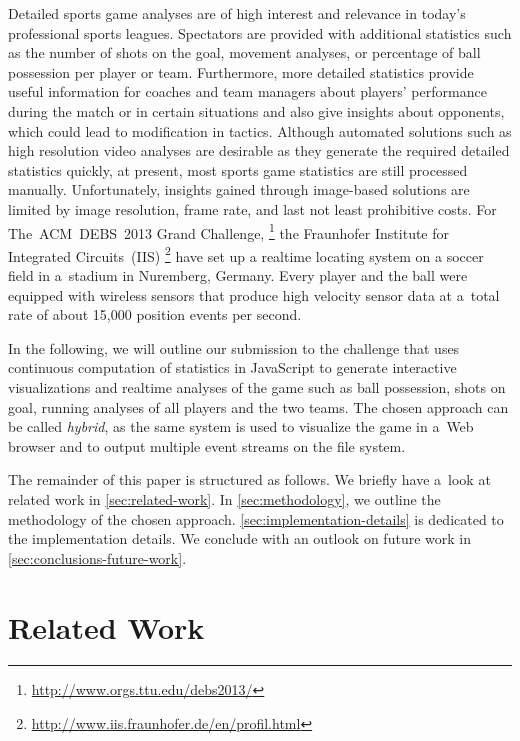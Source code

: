\documentclass{sig-alternate}
\newcommand{\inlinelistingsize}{\fontsize{8pt}{11pt}}
\let\oldurl\url
\renewcommand{\url}[1]{\inlinelistingsize\oldurl{#1}}
\begin{document}
Detailed sports game analyses are of high interest and
relevance in today’s professional sports leagues.
Spectators are provided with additional statistics
such as the number of shots on the goal, movement analyses,
or percentage of ball possession per player or team.
Furthermore, more detailed statistics provide useful information
for coaches and team managers about players' performance
during the match or in certain situations
and also give insights about opponents,
which could lead to modification in tactics.
Although automated solutions
such as high resolution video analyses are desirable
as they generate the required detailed statistics quickly,
at present, most sports game statistics are still processed manually.
Unfortunately, insights gained through image-based solutions
are limited by image resolution, frame rate, and last not least
prohibitive costs.
For The~ACM~DEBS~2013 Grand Challenge,%
\footnote{\url{http://www.orgs.ttu.edu/debs2013/}}
the Fraunhofer Institute for Integrated Circuits~(IIS)%
\footnote{\url{http://www.iis.fraunhofer.de/en/profil.html}}
have set up a realtime locating system on a soccer field
in a~stadium in Nuremberg, Germany.
Every player and the ball were equipped with wireless sensors
that produce high velocity sensor data at a~total rate
of about 15,000 position events per second.

In the following, we will outline our submission to the challenge
that uses continuous computation of statistics in JavaScript
to generate interactive visualizations and realtime analyses
of the game such as ball possession, shots on goal,
running analyses of all players and the two teams.
The chosen approach can be called \emph{hybrid},
as the same system is used to visualize the game in a~Web browser
and to output multiple event streams on the file system.

The remainder of this paper is structured as follows.
We briefly have a~look at related work in \autoref{sec:related-work}.
In \autoref{sec:methodology}, we outline
the methodology of the chosen approach.
\autoref{sec:implementation-details}
is dedicated to the implementation details.
We conclude with an outlook on future work in \autoref{sec:conclusions-future-work}.

\section{Related Work}
\label{sec:related-work}
\end{document}
